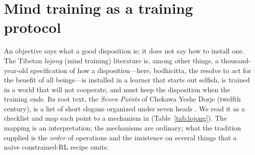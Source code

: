 \section{Mind training as a training protocol}
\label{sec:lojong}

An objective says what a good disposition is; it does not say how to install one.
The Tibetan \emph{lojong} (mind training) literature is, among other things, a thousand-year-old specification of how a disposition---here, bodhicitta, the resolve to act for the benefit of all beings---is installed in a learner that starts out selfish, is trained in a world that will not cooperate, and must keep the disposition when the training ends.
Its root text, the \emph{Seven Points} of Chekawa Yeshe Dorje (twelfth century), is a list of short slogans organized under seven heads \cite{kongtrul1987}.
We read it as a checklist and map each point to a mechanism in \BRAG{} (Table~\ref{tab:lojong}).
The mapping is an interpretation; the mechanisms are ordinary; what the tradition supplied is the \emph{order} of operations and the insistence on several things that a naive constrained-RL recipe omits.


